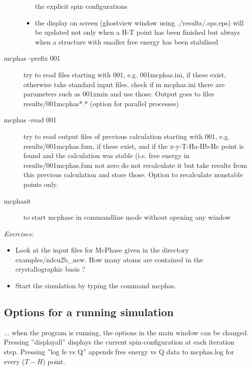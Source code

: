 \begin{description}
\begin{itemize}
				    the explicit spin configurations
			          \item the display on screen (ghostview window using 
				     {\prg ./results/.sps.eps}) will be updated not only 
				    when a H-T point has been finished but always 
				    when a structure with smaller free energy 
				    has been stabilised
  \end{itemize}
 \item[\prg mcphas\index{mcphas}  -prefix 001  ]  try to read files starting with 001, e.g.
 		    001mcphas.ini, if these exist, otherwise take
 		    standard input files, check if in mcphas.ini there are
                   parameters such as 001xmin and use those. Output goes to files
 		    results/001mcphas*.* (option for parallel processes)
 \item[\prg mcphas\index{mcphas}         -read  001 ]   try to read output files of previous calculation starting
 		     with 001, e.g. results/001mcphas.fum, if these exist, and if 
 		    the x-y-T-Ha-Hb-Hc point is found and the calculation was stable 
                   (i.e. free energy in results/001mcphas.fum not zero do not 
                   recalculate it but take results from this previous calculation
 		     and store those. Option to recalculate nonstable points only.
\item[\prg mcphasit\index{mcphas}] to start mcphase in commandline mode without opening any window
\end{description}

\vspace{1cm}
{\em Exercises:}
\begin{itemize}
\item Look at the input files for {\prg McPhase} given in the directory
{\prg examples/ndcu2b\_new}.  How many atoms are contained in the crystallographic basis ?
\item
Start the simulation by typing the command {\prg mcphas}.
\end{itemize}



\subsection{Options for a running simulation}
... when the program is running, the options in the main window
can be changed. Pressing ''displayall'' displays the current spin-configuration
at each iteration step. Pressing ''log fe vs Q'' appends free energy vs Q
data to {\prg mcphas.log} for every ($T-H$) point.


